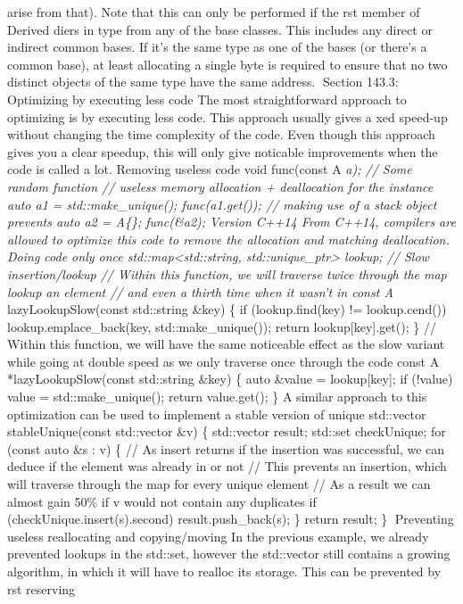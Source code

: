 arise from that). Note that this can only be performed if the rst member
of Derived diers in type from any of the base classes. This includes any
direct or indirect common bases. If it's the same type as one of the
bases (or there's a common base), at least allocating a single byte is
required to ensure that no two distinct objects of the same type have
the same address. Section 143.3: Optimizing by executing less code The
most straightforward approach to optimizing is by executing less code.
This approach usually gives a xed speed-up without changing the time
complexity of the code. Even though this approach gives you a clear
speedup, this will only give noticable improvements when the code is
called a lot. Removing useless code void func(const A \emph{a); // Some
random function // useless memory allocation + deallocation for the
instance auto a1 = std::make\_unique(); func(a1.get()); // making use of
a stack object prevents auto a2 = A\{\}; func(\&a2); Version C++14 From
C++14, compilers are allowed to optimize this code to remove the
allocation and matching deallocation. Doing code only once
std::map\textless std::string, std::unique\_ptr\textgreater{} lookup; //
Slow insertion/lookup // Within this function, we will traverse twice
through the map lookup an element // and even a thirth time when it
wasn't in const A }lazyLookupSlow(const std::string \&key) \{ if
(lookup.find(key) != lookup.cend()) lookup.emplace\_back(key,
std::make\_unique()); return lookup{[}key{]}.get(); \} // Within this
function, we will have the same noticeable effect as the slow variant
while going at double speed as we only traverse once through the code
const A *lazyLookupSlow(const std::string \&key) \{ auto \&value =
lookup{[}key{]}; if (!value) value = std::make\_unique(); return
value.get(); \} A similar approach to this optimization can be used to
implement a stable version of unique std::vector stableUnique(const
std::vector \&v) \{ std::vector result; std::set checkUnique; for (const
auto \&s : v) \{ // As insert returns if the insertion was successful,
we can deduce if the element was already in or not // This prevents an
insertion, which will traverse through the map for every unique element
// As a result we can almost gain 50\% if v would not contain any
duplicates if (checkUnique.insert(s).second) result.push\_back(s); \}
return result; \} Preventing useless reallocating and copying/moving In
the previous example, we already prevented lookups in the std::set,
however the std::vector still contains a growing algorithm, in which it
will have to realloc its storage. This can be prevented by rst reserving
